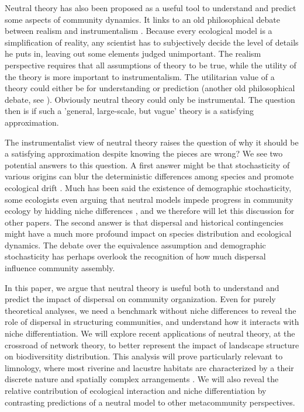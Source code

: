 \documentclass[12pt]{article}
\begin{document}
Neutral theory has also been proposed as a useful tool to understand and predict
some aspects of community dynamics. It links to an old philosophical debate
between realism and instrumentalism \parencite{Wennekes2011}. Because every
ecological model is a simplification of reality, any scientist has to
subjectively decide the level of details he puts in, leaving out some elements
judged unimportant. The realism perspective requires that all assumptions of
theory to be true, while the utility of the theory is more important to
instrumentalism. The utilitarian value of a theory could either be for
understanding or prediction (another old philosophical debate, see
\textcite{Schmueli2010}). Obviously neutral theory could only be instrumental.
The question then is if such a 'general, large-scale, but vague' theory
\parencite{Wennekes2011} is a satisfying approximation. 

The instrumentalist view of neutral theory raises the question of why it should
be a satisfying approximation despite knowing the pieces are wrong? We see two
potential answers to this question. A first answer might be that stochasticity
of various origins can blur the deterministic differences among species and
promote ecological drift \parencite{Gravel2011}. Much has been said the
existence of demographic stochasticity, some ecologists even arguing that
neutral models impede progress in community ecology by hidding niche differences
\parencite{Clark2012}, and we therefore will let this discussion for other
papers. The second answer is that dispersal and historical contingencies might
have a much more profound impact on species distribution \parencite{Bahn2007,
Boulangeat2012} and ecological dynamics. The debate over the equivalence
assumption and demographic stochasticity has perhaps overlook the recognition of
how much dispersal influence community assembly.

In this paper, we argue that neutral theory is useful both to understand and
predict the impact of dispersal on community organization. Even for purely
theoretical analyses, we need a benchmark without niche differences to reveal
the role of dispersal in structuring communities, and understand how it
interacts with niche differentiation. We will explore recent applications of
neutral theory, at the crossroad of network theory, to better represent the
impact of landscape structure on biodiversitity distribution. This analysis will
prove particularly relevant to limnology, where most riverine and lacustre
habitats are characterized by a their discrete nature and spatially complex
arrangements \parencite{Peterson2013}. We will also reveal the relative
contribution of ecological interaction and niche differentiation by contrasting
predictions of a neutral model to other metacommunity perspectives. 
\end{document}
